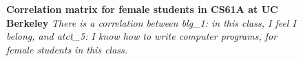 \documentclass{beamer}                  %
\begin{document}
\begin{frame}
  \begin{figure}[!htbp]
    \centering
%
\caption {\textbf{Correlation matrix for female students in CS61A at UC Berkeley}
\textit{There is a correlation between blg\_1: in this class, I feel I belong, and atct\_5: I know how to write computer programs, for female students in this class. }}
\label{fig:corrFemale}
\end{figure}
\end{frame}


\clearpage
\end{document}
